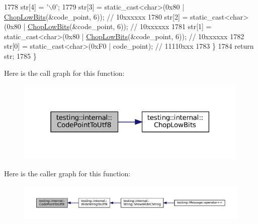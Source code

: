 \begin{DoxyCode}
1778     str[4] = \textcolor{charliteral}{'\(\backslash\)0'};
1779     str[3] = \textcolor{keyword}{static\_cast<}\textcolor{keywordtype}{char}\textcolor{keyword}{>}(0x80 | \hyperlink{namespacetesting_1_1internal_a2c54b453387aa8a18f2f3e09f10b5a7d}{ChopLowBits}(&code\_point, 6));  \textcolor{comment}{// 10xxxxxx}
1780     str[2] = \textcolor{keyword}{static\_cast<}\textcolor{keywordtype}{char}\textcolor{keyword}{>}(0x80 | \hyperlink{namespacetesting_1_1internal_a2c54b453387aa8a18f2f3e09f10b5a7d}{ChopLowBits}(&code\_point, 6));  \textcolor{comment}{// 10xxxxxx}
1781     str[1] = \textcolor{keyword}{static\_cast<}\textcolor{keywordtype}{char}\textcolor{keyword}{>}(0x80 | \hyperlink{namespacetesting_1_1internal_a2c54b453387aa8a18f2f3e09f10b5a7d}{ChopLowBits}(&code\_point, 6));  \textcolor{comment}{// 10xxxxxx}
1782     str[0] = \textcolor{keyword}{static\_cast<}\textcolor{keywordtype}{char}\textcolor{keyword}{>}(0xF0 | code\_point);                   \textcolor{comment}{// 11110xxx}
1783   \}
1784   \textcolor{keywordflow}{return} str;
1785 \}
\end{DoxyCode}
Here is the call graph for this function\+:
\nopagebreak
\begin{figure}[H]
\begin{center}
\leavevmode
\includegraphics[width=316pt]{namespacetesting_1_1internal_a0c0f9558efb9abb965851c4738cdc725_cgraph}
\end{center}
\end{figure}
Here is the caller graph for this function\+:
\nopagebreak
\begin{figure}[H]
\begin{center}
\leavevmode
\includegraphics[width=350pt]{namespacetesting_1_1internal_a0c0f9558efb9abb965851c4738cdc725_icgraph}
\end{center}
\end{figure}
\mbox{\label{namespacetesting_1_1internal_adef3055706176001364e54eb73a87e31}} 
